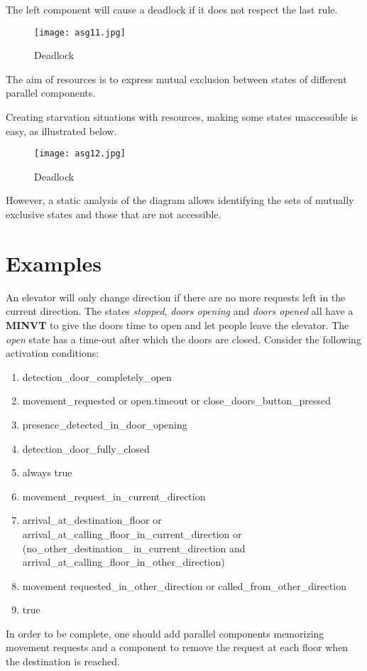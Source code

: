 \documentclass[../main.tex]{subfiles}
\begin{document}
\begin{exmp}
The left component will cause a deadlock if it does not respect the last rule.
\begin{figure}[H]
    \centering
    \texttt{[image: asg11.jpg]}
    \caption{Deadlock}
    \label{asg11}
\end{figure}
\end{exmp}
The aim of resources is to express mutual exclusion between states of different parallel components.
\begin{exmp}
Creating starvation situations with resources, making some states unaccessible is easy, as illustrated below.
\begin{figure}[H]
    \centering
    \texttt{[image: asg12.jpg]}
    \caption{Deadlock}
    \label{asg12}
\end{figure}
However, a static analysis of the diagram allows identifying the sets of mutually exclusive states and those that are not accessible. 
\end{exmp}

\section{Examples}
\begin{exmp}
An elevator will only change direction if there are no more requests left in the current direction. The states \textit{stopped}, \textit{doors opening} and \textit{doors opened} all have a \textbf{MINVT} to give the doors time to open and let people leave the elevator. The \textit{open} state has a time-out after which the doors are closed. Consider the following activation conditions:
\begin{enumerate}
	\item detection\_door\_completely\_open
	\item movement\_requested or open.timeout or close\_doors\_button\_pressed
	\item presence\_detected\_in\_door\_opening
	\item detection\_door\_fully\_closed
	\item always true
	\item movement\_request\_in\_current\_direction
	\item arrival\_at\_destination\_floor or arrival\_at\_calling\_floor\_in\_current\_direction or \\ (no\_other\_destination\_ in\_current\_direction and arrival\_at\_calling\_floor\_in\_other\_direction)
	\item movement requested\_in\_other\_direction or called\_from\_other\_direction
	\item true
\end{enumerate}
In order to be complete, one should add parallel components memorizing movement requests and a component to remove the request at each floor when the destination is reached.
\end{exmp}
\end{document}
